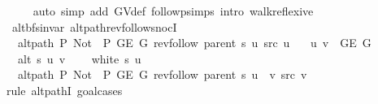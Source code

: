 \begin{isabellebody}
\ \ \ \ \isamarkupfalse%
\ {\isacharparenleft}{\kern0pt}auto\ simp\ add{\isacharcolon}{\kern0pt}\ G{\isachardot}{\kern0pt}V{\isacharunderscore}{\kern0pt}def\ follow{\isacharunderscore}{\kern0pt}psimps\ intro{\isacharcolon}{\kern0pt}\ walk{\isacharunderscore}{\kern0pt}reflexive{\isacharparenright}{\kern0pt}\isanewline
{}\isamarkupfalse%
%
\endisatagproof
{\isafoldproof}%
%
\isadelimproof
\isanewline
%
\endisadelimproof
\isanewline
{}\isamarkupfalse%
\ {\isacharparenleft}{\kern0pt}\ alt{\isacharunderscore}{\kern0pt}bfs{\isacharunderscore}{\kern0pt}invar{\isacharparenright}{\kern0pt}\ alt{\isacharunderscore}{\kern0pt}path{\isacharunderscore}{\kern0pt}rev{\isacharunderscore}{\kern0pt}follow{\isacharunderscore}{\kern0pt}snocI{\isacharcolon}{\kern0pt}\isanewline
\ \ \ {\isachardoublequoteopen}alt{\isacharunderscore}{\kern0pt}path\ P{\isacharprime}{\kern0pt}{\isacharprime}{\kern0pt}\ {\isacharparenleft}{\kern0pt}Not\ {\isasymcirc}\ P{\isacharprime}{\kern0pt}{\isacharprime}{\kern0pt}{\isacharparenright}{\kern0pt}\ {\isacharparenleft}{\kern0pt}G{\isachardot}{\kern0pt}E\ G{\isacharparenright}{\kern0pt}\ {\isacharparenleft}{\kern0pt}rev{\isacharunderscore}{\kern0pt}follow\ {\isacharparenleft}{\kern0pt}parent\ s{\isacharparenright}{\kern0pt}\ u{\isacharparenright}{\kern0pt}\ src\ u{\isachardoublequoteclose}\isanewline
\ \ \ {\isachardoublequoteopen}{\isacharbraceleft}{\kern0pt}u{\isacharcomma}{\kern0pt}\ v{\isacharbraceright}{\kern0pt}\ {\isasymin}\ G{\isachardot}{\kern0pt}E\ G{\isachardoublequoteclose}\isanewline
\ \ \ {\isachardoublequoteopen}alt\ s\ u\ v{\isachardoublequoteclose}\isanewline
\ \ \ {\isachardoublequoteopen}{\isasymnot}\ white\ s\ u{\isachardoublequoteclose}\isanewline
\ \ \ {\isachardoublequoteopen}alt{\isacharunderscore}{\kern0pt}path\ P{\isacharprime}{\kern0pt}{\isacharprime}{\kern0pt}\ {\isacharparenleft}{\kern0pt}Not\ {\isasymcirc}\ P{\isacharprime}{\kern0pt}{\isacharprime}{\kern0pt}{\isacharparenright}{\kern0pt}\ {\isacharparenleft}{\kern0pt}G{\isachardot}{\kern0pt}E\ G{\isacharparenright}{\kern0pt}\ {\isacharparenleft}{\kern0pt}rev{\isacharunderscore}{\kern0pt}follow\ {\isacharparenleft}{\kern0pt}parent\ s{\isacharparenright}{\kern0pt}\ u\ {\isacharat}{\kern0pt}\ {\isacharbrackleft}{\kern0pt}v{\isacharbrackright}{\kern0pt}{\isacharparenright}{\kern0pt}\ src\ v{\isachardoublequoteclose}\isanewline
%
\isadelimproof
%
\endisadelimproof
%
\isatagproof
{}\isamarkupfalse%
\ {\isacharparenleft}{\kern0pt}rule\ alt{\isacharunderscore}{\kern0pt}pathI{\isacharcomma}{\kern0pt}\ goal{\isacharunderscore}{\kern0pt}cases{\isacharparenright}{\kern0pt}\isanewline

\end{isabellebody}
